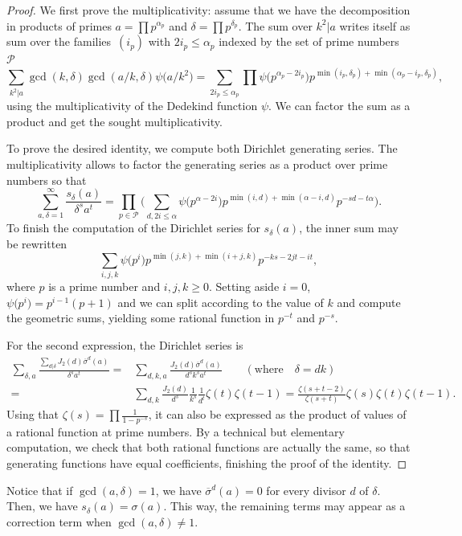 \documentclass[11pt]{article}
\numberwithin{equation}{section}
\renewcommand{\P}{\mathcal{P}}
\numberwithin{equation}{section}
\theoremstyle{definition}
\begin{document}
\begin{proof}
We first prove the multiplicativity: assume that we have the decomposition in products of primes $a=\prod p^{\alpha_p}$ and $\delta=\prod p^{\delta_p}$. The sum over $k^2|a$ writes itself as sum over the families~$(i_p)$ with $2i_p\leqslant \alpha_p$ indexed by the set of prime numbers $\P$
\[ \sum_{k^2|a}\gcd(k,\delta)\gcd(a/k,\delta)\psi\bigl(a/k^2\bigr) = \sum_{2i_p\leqslant \alpha_p}\prod \psi\bigl(p^{\alpha_p-2i_p}\bigr)p^{\min(i_p,\delta_p)+\min(\alpha_p-i_p,\delta_p)}, \]
using the multiplicativity of the Dedekind function $\psi$. We can factor the sum as a product and get the sought multiplicativity.

To prove the desired identity, we compute both Dirichlet generating series. The multiplicativity allows to factor the generating series as a product over prime numbers so that
\[ \sum_{a,\delta=1}^\infty \frac{s_\delta(a)}{\delta^sa^t} = \prod_{p\in\P} \biggl(\sum_{d,2i\leqslant\alpha} \psi\bigl(p^{\alpha-2i}\bigr)p^{\min(i,d)+\min(\alpha-i,d)}p^{-sd-t\alpha} \biggr). \]
To finish the computation of the Dirichlet series for $s_\delta(a)$, the inner sum may be rewritten
\[ \sum_{i,j,k}\psi\bigl(p^i\bigr)p^{\min(j,k)+\min(i+j,k)}p^{-ks-2jt-it}, \]
where $p$ is a prime number and $i,j,k\geqslant 0$. Setting aside $i=0$, $\psi\bigl(p^i\bigr)=p^{i-1}(p+1)$ and we can split according to the value of $k$ and compute the geometric sums, yielding some rational function in $p^{-t}$ and $p^{-s}$.

For the second expression, the Dirichlet series is
\begin{align*}
\sum_{\delta,a} \frac{\sum_{d|\delta} J_2(d)\overline{\sigma}^d(a)}{\delta^s a^t} ={} & \sum_{d,k,a}\frac{J_2(d)\overline{\sigma}^d(a)}{d^sk^sa^t} \qquad(\text{where}\quad\delta=dk) \\
= {}& \sum_{d,k} \frac{J_2(d)}{d^s}\frac{1}{k^s}\frac{1}{d^t}\zeta(t)\zeta(t-1)
= \frac{\zeta(s+t-2)}{\zeta(s+t)}\zeta(s)\zeta(t)\zeta(t-1).
\end{align*}
Using that $\zeta(s)=\prod\frac{1}{1-p^{-s}}$, it can also be expressed as the product of values of a rational function at prime numbers. By a technical but elementary computation, we check that both rational functions are actually the same, so that generating functions have equal coefficients, finishing the proof of the identity.
\end{proof}

Notice that if $\gcd(a,\delta)=1$, we have $\overline{\sigma}^d(a)=0$ for every divisor $d$ of $\delta$. Then, we have $s_\delta(a)=\sigma(a)$. This way, the remaining terms may appear as a correction term when $\gcd(a,\delta)\neq 1$.
\end{document}
